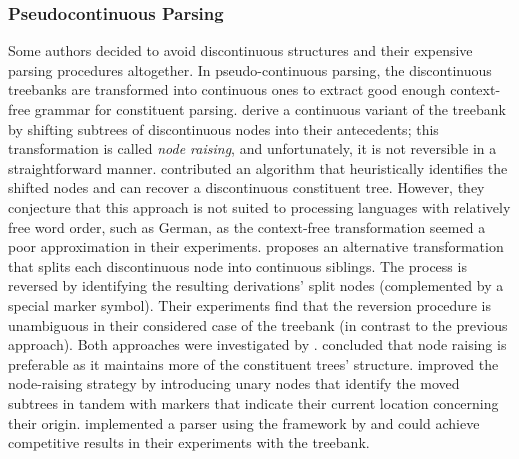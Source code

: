 \documentclass[../document.tex]{subfiles}
\begin{document}
    \subsubsection*{Pseudocontinuous Parsing}
    Some authors decided to avoid discontinuous structures and their expensive parsing procedures altogether.
    In pseudo-continuous parsing, the discontinuous treebanks are transformed into continuous ones to extract good enough context-free grammar for constituent parsing.
     derive a continuous variant of the \negra{} treebank by shifting subtrees of discontinuous nodes into their antecedents; this transformation is called \emph{node raising}, and unfortunately, it is not reversible in a straightforward manner.
     contributed an algorithm that heuristically identifies the shifted nodes and can recover a discontinuous constituent tree.
    However, they conjecture that this approach is not suited to processing languages with relatively free word order, such as German, as the context-free transformation seemed a poor approximation in their experiments.
     proposes an alternative transformation that splits each discontinuous node into continuous siblings.
    The process is reversed by identifying the resulting derivations' split nodes (complemented by a special marker symbol).
    Their experiments find that the reversion procedure is unambiguous in their considered case of the \tiger{} treebank (in contrast to the previous approach).
    Both approaches were investigated by \citet{hsu2010comparing}.
     concluded that node raising is preferable as it maintains more of the constituent trees' structure.
     improved the node-raising strategy by introducing unary nodes that identify the moved subtrees in tandem with markers that indicate their current location concerning their origin.
    \citeauthor{Ver16} implemented a parser using the  framework by \citet{Petrov06} and could achieve competitive results in their experiments with the \tiger{} treebank.

\end{document}
